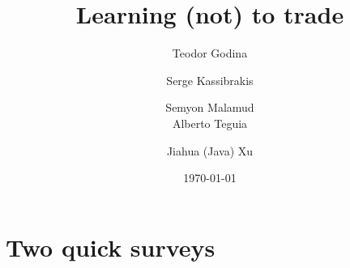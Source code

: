 \documentclass{beamer}
\title[Short title]{Learning (not) to trade} %
\author{Teodor Godina \and Serge Kassibrakis \and Semyon Malamud
	\\
	Alberto Teguia \and Jiahua (Java) Xu} %
\institute[EPFL]
{
Swissquote, EPFL, SFI, UBC \\ %
\medskip
}
\date{\today} %
\begin{document}
\begin{frame}
\titlepage %
\end{frame}



\section{Two quick surveys}
\end{document}
